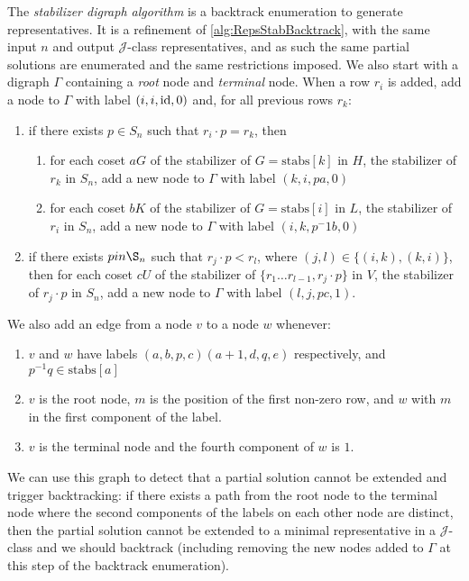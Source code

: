 \documentclass[11pt]{article}
\numberwithin{equation}{section}
\newcommand{\id}{\mbox{\rm id}}
\newcommand{\J}{\mathscr{J}}
\begin{document}
The \emph{stabilizer digraph algorithm} is a backtrack enumeration to generate
representatives. It is a refinement of \ref{alg:RepsStabBacktrack}, with the
same input $n$ and output $\J$-class representatives, and as such the same
partial solutions are enumerated and the same restrictions imposed. We also
start with a digraph $\Gamma$ containing a \emph{root} node and \emph{terminal}
node. When a row $r_i$ is added, add a node to $\Gamma$ with label $(i, i, \id,
0)$ and, for all previous rows $r_k$:
\begin{enumerate}
  \item if there exists $p \in S_n$ such that $r_i \cdot p = r_k$, then
    \begin{enumerate}
      \item for each coset $aG$ of the stabilizer of $G = \text{stabs}[k]$ in
        $H$, the stabilizer of $r_k$ in $S_n$, add a new node to $\Gamma$ with
        label $(k, i, pa, 0)$ \\
      \item for each coset $bK$ of the stabilizer of $G = \text{stabs}[i]$ in
        $L$, the stabilizer of $r_i$ in $S_n$, add a new node to $\Gamma$ with
        label $(i, k, p ^ -1 b, 0)$
    \end{enumerate}
  \item if there exists $p in \S_n$ such that $r_j \cdot p < r_l$, where $(j, l)
    \in \{(i, k), (k, i)\}$, then for each coset $cU$ of the stabilizer of $\{r_1
      \ldots r_{l - 1}, r_j \cdot p \}$ in $V$, the stabilizer of $r_j \cdot p$
    in $S_n$, add a new node to $\Gamma$ with label $(l, j, pc, 1)$.
\end{enumerate}
We also add an edge from a node $v$ to a node $w$ whenever:
\begin{enumerate}
  \item $v$ and $w$ have labels $(a, b, p, c) (a + 1, d, q, e)$ respectively,
    and $p^{-1} q \in \text{stabs}[a]$ \\
  \item $v$ is the root node, $m$ is the position of the first non-zero row, and
    $w$ with $m$ in the first component of the label.
  \item $v$ is the terminal node and the fourth component of $w$ is $1$.
\end{enumerate}

We can use this graph to detect that a partial solution cannot be extended and
trigger backtracking: if there exists a path from the root node to the terminal
node where the second components of the labels on each other node are distinct,
then the partial solution cannot be extended to a minimal representative in a
$\J$-class and we should backtrack (including removing the new nodes added to
$\Gamma$ at this step of the backtrack enumeration).
\end{document}
